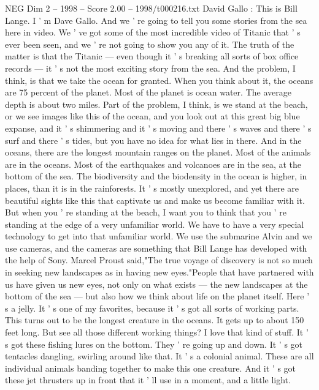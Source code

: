 \begin{textsample}{NEG Dim 2 – 1998 – Score 2.00 – 1998/t000216.txt}  \label{ex:f2_neg_034}
David Gallo : This is Bill Lange.
I ' m Dave Gallo.
And we ' re going to tell you some stories from the sea here in video.
We ' ve got some of the most incredible video of Titanic that ' s ever been seen, and we ' re not going to show you any of it.
The truth of the matter is that the Titanic — even though it ' s breaking all sorts of box office records — it ' s not the most exciting story from the sea.
And the problem, I think, is that we take the ocean for granted.
When you think about it, the oceans are 75 percent of the planet.
Most of the planet is ocean water.
The average depth is about two miles.
Part of the problem, I think, is we stand at the beach, or we see images like this of the ocean, and you look out at this great big blue expanse, and it ' s shimmering and it ' s moving and there ' s waves and there ' s surf and there ' s tides, but you have no idea for what lies in there.
And in the oceans, there are the longest mountain ranges on the planet.
Most of the animals are in the oceans.
Most of the earthquakes and volcanoes are in the sea, at the bottom of the sea.
The biodiversity and the biodensity in the ocean is higher, in places, than it is in the rainforests.
It ' s mostly unexplored, and yet there are beautiful sights like this that captivate us and make us become familiar with it.
But when you ' re standing at the beach, I want you to think that you ' re standing at the edge of a very unfamiliar world.
We have to have a very special technology to get into that unfamiliar world.
We use the submarine Alvin and we use cameras, and the cameras are something that Bill Lange has developed with the help of Sony.
Marcel Proust said,"The true voyage of discovery is not so much in seeking new landscapes as in having new eyes."People that have partnered with us have given us new eyes, not only on what exists — the new landscapes at the bottom of the sea — but also how we think about life on the planet itself.
Here ' s a jelly.
It ' s one of my favorites, because it ' s got all sorts of working parts.
This turns out to be the longest creature in the oceans.
It gets up to about 150 feet long.
But see all those different working things?
I love that kind of stuff.
It ' s got these fishing lures on the bottom.
They ' re going up and down.
It ' s got tentacles dangling, swirling around like that.
It ' s a colonial animal.
These are all individual animals banding together to make this one creature.
And it ' s got these jet thrusters up in front that it ' ll use in a moment, and a little light.

\end{textsample}
